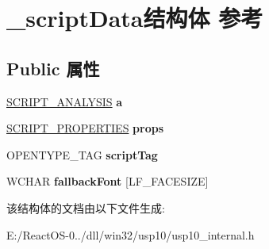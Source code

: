 \hypertarget{struct__script_data}{}\section{\+\_\+script\+Data结构体 参考}
\label{struct__script_data}
\subsection*{Public 属性}
\begin{DoxyCompactItemize}
\item 
\mbox{\label{struct__script_data_a9c757d34156a92139fb84f28750ba197}} 
\hyperlink{structtag___s_c_r_i_p_t___a_n_a_l_y_s_i_s}{S\+C\+R\+I\+P\+T\+\_\+\+A\+N\+A\+L\+Y\+S\+IS} {\bfseries a}
\item 
\mbox{\label{struct__script_data_ae46fd32bf273a22f9cf98d2772f476be}} 
\hyperlink{struct_s_c_r_i_p_t___p_r_o_p_e_r_t_i_e_s}{S\+C\+R\+I\+P\+T\+\_\+\+P\+R\+O\+P\+E\+R\+T\+I\+ES} {\bfseries props}
\item 
\mbox{\label{struct__script_data_a32e1a8ac0833c6788b1138538c2f0f1b}} 
O\+P\+E\+N\+T\+Y\+P\+E\+\_\+\+T\+AG {\bfseries script\+Tag}
\item 
\mbox{\label{struct__script_data_a5212c9f4c5a72a0898c36f35a2738375}} 
W\+C\+H\+AR {\bfseries fallback\+Font} \mbox{[}L\+F\+\_\+\+F\+A\+C\+E\+S\+I\+ZE\mbox{]}
\end{DoxyCompactItemize}


该结构体的文档由以下文件生成\+:\begin{DoxyCompactItemize}
\item 
E\+:/\+React\+O\+S-\/0../dll/win32/usp10/usp10\+\_\+internal.\+h\end{DoxyCompactItemize}
